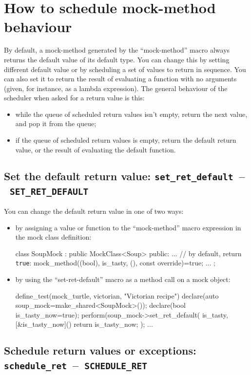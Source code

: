 \documentclass[twoside, a4paper, article]{memoir}
\newcommand*\testudocolor{\color{red!80!blue}}
\newcommand*\testudo[1]{\texttt{\testudocolor{}#1}}
\newcommand*\testudopair[2]{\testudo{#1}~--~\testudo{#2}}
\newcommand\subsectiontestudopair[3]{%
  \subsection[#1]{#1: \testudopair{#2}{#3}}}
\begin{document}
\section{How to schedule mock-method behaviour}
\label{sec:schedule-mock-method}

By default, a mock-method generated by the ``mock-method'' macro always returns
the default value of its default type.  You can change this by setting
different default value or by scheduling a set of values to return in sequence.
You can also set it to return the result of evaluating a function with no
arguments (given, for instance, as a lambda expression).  The general behaviour
of the scheduler when asked for a return value is this:
\begin{itemize}
\item while the queue of scheduled return values isn't empty, return the next
  value, and pop it from the queue;
\item if the queue of scheduled return values is empty, return the default
  return value, or the result of evaluating the default function.
\end{itemize}

\subsectiontestudopair{Set the default return value}%
  {set\_ret\_default}{SET\_RET\_DEFAULT}

You can change the default return value in one of two ways:
\begin{itemize}
\item by assigning a value or function to the ``mock-method'' macro expression
  in the mock class definition:
\begin{cpplisting}
class SoupMock
  : public MockClass<Soup> {
public:
  ...
  // by default, return \texttt{true}:
  mock_method((bool), is_tasty, (), const override)=true;
  ...
};
\end{cpplisting}
\item by using the ``set-ret-default'' macro as a method call on a mock object:
\begin{cpplisting}
define_test(mock_turtle, victorian, "Victorian recipe") {
  declare(auto soup_mock=make_shared<SoupMock>());
  declare(bool is_tasty_now=true);
  perform(soup_mock->set_ret_default(
            is_tasty,
            [&is_tasty_now]() { return is_tasty_now; });
  ...
}
\end{cpplisting}
\end{itemize}

\subsectiontestudopair{Schedule return values or exceptions}%
  {schedule\_ret}{SCHEDULE\_RET}
\end{document}
